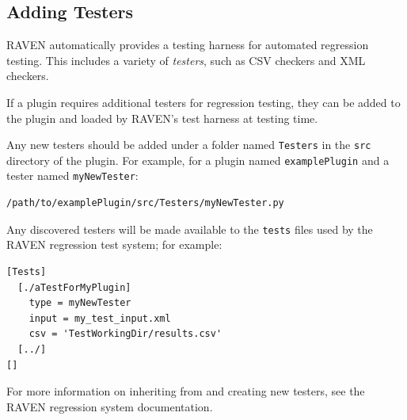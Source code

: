 \subsection{Adding Testers}
RAVEN automatically provides a testing harness for automated regression testing. This includes a
variety of \emph{testers}, such as CSV checkers and XML checkers.

If a plugin requires additional testers for regression testing, they can be added to the plugin and
loaded by RAVEN's test harness at testing time.

Any new testers should be added under a folder named \texttt{Testers} in the \texttt{src} directory
of the plugin. For example, for a plugin named \texttt{examplePlugin} and a tester named
\texttt{myNewTester}:
\begin{lstlisting}[morekeywords={examplePlugin,myNewTester}]
  /path/to/examplePlugin/src/Testers/myNewTester.py
\end{lstlisting}
Any discovered testers will be made available to the \texttt{tests} files used by the RAVEN
regression test system; for example:
\begin{lstlisting}[morekeywords={myNewTester}]
[Tests]
  [./aTestForMyPlugin]
    type = myNewTester
    input = my_test_input.xml
    csv = 'TestWorkingDir/results.csv'
  [../]
[]
\end{lstlisting}

For more information on inheriting from and creating new testers, see the RAVEN regression system
documentation.

